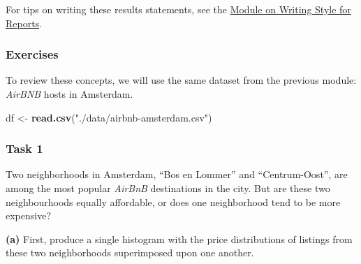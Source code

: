 \documentclass[]{book}
\newenvironment{Shaded}{\begin{snugshade}}{\end{snugshade}}
\newcommand{\KeywordTok}[1]{\textcolor[rgb]{0.13,0.29,0.53}{\textbf{#1}}}
\newcommand{\NormalTok}[1]{#1}
\newcommand{\StringTok}[1]{\textcolor[rgb]{0.31,0.60,0.02}{#1}}
\begin{document}
For tips on writing these results statements, see the \protect\hyperlink{style}{Module on Writing Style for Reports}.

\hypertarget{exercises-10}{%
\subsubsection*{Exercises}\label{exercises-10}}

To review these concepts, we will use the same dataset from the previous module: \emph{AirBNB} hosts in Amsterdam.

\begin{Shaded}
\begin{Highlighting}[]
\NormalTok{df <-}\StringTok{ }\KeywordTok{read.csv}\NormalTok{(}\StringTok{"./data/airbnb-amsterdam.csv"}\NormalTok{)}
\end{Highlighting}
\end{Shaded}

\hypertarget{task-1-1}{%
\subsubsection*{Task 1}\label{task-1-1}}

Two neighborhoods in Amsterdam, ``Bos en Lommer'' and ``Centrum-Oost'', are among the most popular \emph{AirBnB} destinations in the city. But are these two neighbourhoods equally affordable, or does one neighborhood tend to be more expensive?

\textbf{(a)} First, produce a single histogram with the price distributions of listings from these two neighborhoods superimposed upon one another.
\end{document}
